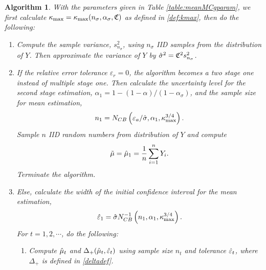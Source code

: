 \documentclass{iitthesis}
\newtheorem{algorithm}[theorem]{Algorithm}
\theoremstyle{definition}
\begin{document}
\begin{algorithm}
With the parameters given in Table \ref{table:meanMCgparam}, we first calculate $\kappa_{\max}=\kappa_{\max}(n_\sigma,\alpha_\sigma,\mathfrak{C})$ as defined in \eqref{def:kmax}, then do the following:
\begin{enumerate}
\item Compute the sample variance, $s^2_{n_{\sigma}}$, using $n_\sigma$ IID samples from the distribution of $Y$. Then approximate the variance of $Y$ by $\hat{\sigma}^2 = \mathfrak{C}^2 s^2_{n_\sigma}$. 
\item If the relative error tolerance $\varepsilon_r=0$, the algorithm becomes a two stage one instead of multiple stage one. Then calculate the uncertainty level for the second stage estimation, $\alpha_1 = 1-(1-\alpha)/(1-\alpha_\sigma)$, and the sample size for mean estimation,
$$n_1 = N_{CB}\left(\varepsilon_a/\hat{\sigma},\alpha_1,\kappa_{\max}^{3/4}\right).$$ 
Sample $n$ IID random numbers from distribution of $Y$ and compute $$\tilde{\mu} =\hat{\mu}_1 = \frac1n\sum_{i=1}^nY_i.$$
Terminate the algorithm.
\item Else, calculate the width of the initial confidence interval for the mean estimation,
\begin{align}\label{eps1def}
\hat{\varepsilon}_1=\hat{\sigma} N_{CB}^{-1}\left(n_1,\alpha_1,\kappa_{\max}^{3/4}\right).
\end{align}
For $t = 1,2,\cdots$, do the following:
\begin{enumerate}
\item  \label{deltamu}Compute $\hat{\mu}_t$ and $\Delta_{+}(\hat{\mu}_t,\hat{\varepsilon}_t)$ using sample size $n_t$ and tolerance $\hat{\varepsilon}_t$, where $\Delta_{+}$ is defined in \eqref{deltadef}.

\end{enumerate}
\end{enumerate}
\end{algorithm}
\end{document}
